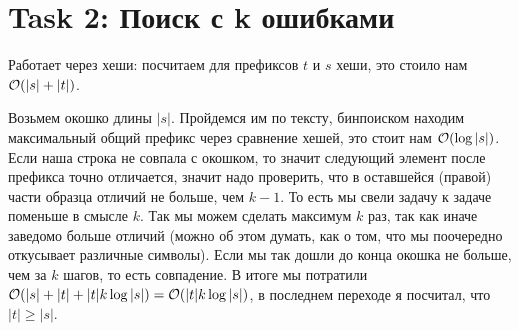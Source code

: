 \section{Task 2: Поиск с k ошибками}
\begin{solution}
    Работает через хеши: посчитаем для префиксов $t$ и $s$ хеши, это стоило нам $\mathcal{O}(|s| + |t|)$.
    
    Возьмем окошко длины $|s|$. Пройдемся им по тексту, бинпоиском находим максимальный общий префикс через сравнение хешей, это стоит нам $\mathcal{O}(\log |s|)$.
    Если наша строка не совпала с окошком, то значит следующий элемент после префикса точно отличается, значит надо проверить, что в оставшейся (правой) части образца отличий не больше, чем $k - 1$. То есть мы свели задачу к задаче поменьше в смысле $k$. Так мы можем сделать максимум $k$ раз, так как иначе заведомо больше отличий (можно об этом думать, как о том, что мы поочередно откусывает различные символы). Если мы так дошли до конца окошка не больше, чем за $k$ шагов, то есть совпадение. В итоге мы потратили $\mathcal{O}(|s| + |t| + |t|k\log |s|) = \mathcal{O}(|t|k\log |s|)$, в последнем переходе я посчитал, что $|t| \geq |s|$.
\end{solution}